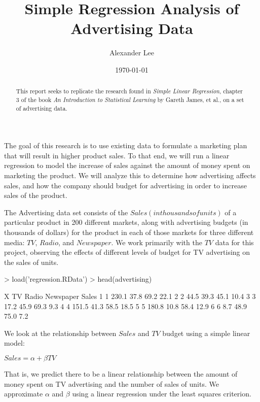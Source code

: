 \documentclass{report}
\title{Simple Regression Analysis of Advertising Data}
\author{Alexander Lee}
\date{\today}
\begin{document}

\maketitle

\begin{abstract}
This report seeks to replicate the research found in \emph{Simple Linear Regression}, chapter 3 of the book \emph{An Introduction to Statistical Learning} by Gareth James, et al., on a set of advertising data.
\end{abstract}

\begin{introduction}
The goal of this research is to use existing data to formulate a marketing plan that will result in higher product sales. To that end, we will run a linear regression to model the increase of sales against the amount of money spent on marketing the product. We will analyze this to determine how advertising affects sales, and how the company should budget for advertising in order to increase sales of the product.
\end{introduction}

\begin{data}
The Advertising data set consists of the $Sales (in thousands of units)$ of a particular product in 200 different markets, along with advertising budgets (in thousands of dollars) for the product in each of those markets for three different media: $TV$, $Radio$, and $Newspaper$. We work primarily with the $TV$ data for this project, observing the effects of different levels of budget for TV advertising on the sales of units.

\begin{Schunk}
\begin{Sinput}
> load('regression.RData')
> head(advertising)
\end{Sinput}
\begin{Soutput}
  X    TV Radio Newspaper Sales
1 1 230.1  37.8      69.2  22.1
2 2  44.5  39.3      45.1  10.4
3 3  17.2  45.9      69.3   9.3
4 4 151.5  41.3      58.5  18.5
5 5 180.8  10.8      58.4  12.9
6 6   8.7  48.9      75.0   7.2
\end{Soutput}
\end{Schunk}
\end{data}

\begin{methodology}
We look at the relationship between $Sales$ and $TV$ budget using a simple linear model:

  $Sales = \alpha + \beta TV$

That is, we predict there to be a linear relationship between the amount of money spent on TV advertising and the number of sales of units. We approximate $\alpha$ and $\beta$ using a linear regression under the least squares criterion.
\end{methodology}
\end{document}
